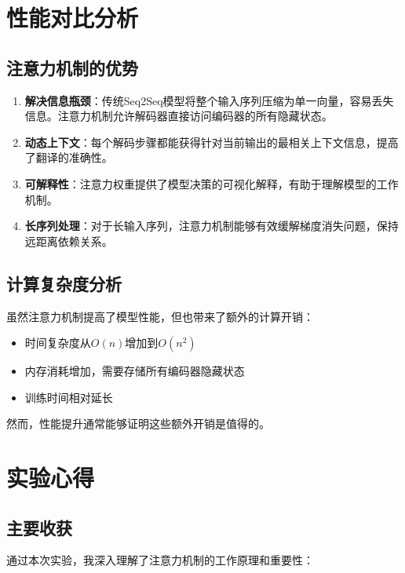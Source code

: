 \documentclass[a4paper]{article}
\begin{document}
\section{性能对比分析}
\subsection{注意力机制的优势}
\begin{enumerate}
    \item \textbf{解决信息瓶颈}：传统Seq2Seq模型将整个输入序列压缩为单一向量，容易丢失信息。注意力机制允许解码器直接访问编码器的所有隐藏状态。
    
    \item \textbf{动态上下文}：每个解码步骤都能获得针对当前输出的最相关上下文信息，提高了翻译的准确性。
    
    \item \textbf{可解释性}：注意力权重提供了模型决策的可视化解释，有助于理解模型的工作机制。
    
    \item \textbf{长序列处理}：对于长输入序列，注意力机制能够有效缓解梯度消失问题，保持远距离依赖关系。
\end{enumerate}

\subsection{计算复杂度分析}
虽然注意力机制提高了模型性能，但也带来了额外的计算开销：
\begin{itemize}
    \item 时间复杂度从$O(n)$增加到$O(n^2)$
    \item 内存消耗增加，需要存储所有编码器隐藏状态
    \item 训练时间相对延长
\end{itemize}

然而，性能提升通常能够证明这些额外开销是值得的。

\section{实验心得}
\subsection{主要收获}
通过本次实验，我深入理解了注意力机制的工作原理和重要性：
\end{document}
